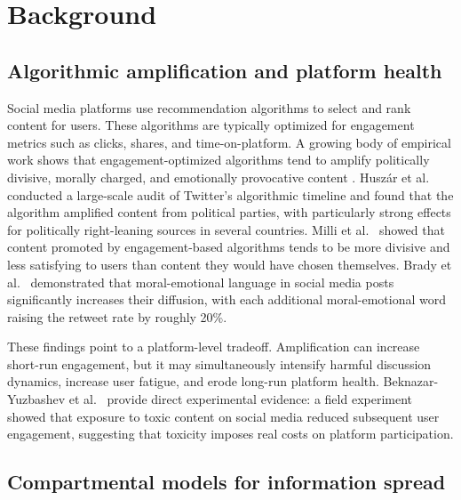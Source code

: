 \documentclass[11pt]{article}
\begin{document}
\newpage
\tableofcontents
\newpage

\section{Background}
\label{sec:background}

\subsection{Algorithmic amplification and platform health}

Social media platforms use recommendation algorithms to select and rank content for users. These algorithms are typically optimized for engagement metrics such as clicks, shares, and time-on-platform. A growing body of empirical work shows that engagement-optimized algorithms tend to amplify politically divisive, morally charged, and emotionally provocative content \cite{huszar2022, milli2025, brady2017}. Husz\'{a}r et al.\ \cite{huszar2022} conducted a large-scale audit of Twitter's algorithmic timeline and found that the algorithm amplified content from political parties, with particularly strong effects for politically right-leaning sources in several countries. Milli et al.\ \cite{milli2025} showed that content promoted by engagement-based algorithms tends to be more divisive and less satisfying to users than content they would have chosen themselves. Brady et al.\ \cite{brady2017} demonstrated that moral-emotional language in social media posts significantly increases their diffusion, with each additional moral-emotional word raising the retweet rate by roughly 20\%.

These findings point to a platform-level tradeoff. Amplification can increase short-run engagement, but it may simultaneously intensify harmful discussion dynamics, increase user fatigue, and erode long-run platform health. Beknazar-Yuzbashev et al.\ \cite{beknazar2025} provide direct experimental evidence: a field experiment showed that exposure to toxic content on social media reduced subsequent user engagement, suggesting that toxicity imposes real costs on platform participation.

\subsection{Compartmental models for information spread}
\end{document}
